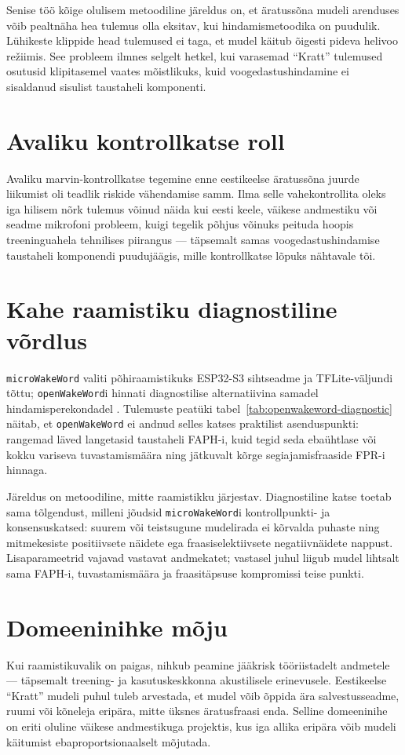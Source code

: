 Senise töö kõige olulisem metoodiline järeldus on, et äratussõna mudeli arenduses võib pealtnäha hea tulemus olla eksitav, kui hindamismetoodika on puudulik. Lühikeste klippide head tulemused ei taga, et mudel käitub õigesti pideva helivoo režiimis. See probleem ilmnes selgelt hetkel, kui varasemad \enquote{Kratt} tulemused osutusid klipitasemel vaates mõistlikuks, kuid voogedastushindamine ei sisaldanud sisulist taustaheli komponenti.

\section{Avaliku kontrollkatse roll}
Avaliku marvin-kontrollkatse tegemine enne eestikeelse äratussõna juurde liikumist oli teadlik riskide vähendamise samm. Ilma selle vahekontrollita oleks iga hilisem nõrk tulemus võinud näida kui eesti keele, väikese andmestiku või seadme mikrofoni probleem, kuigi tegelik põhjus võinuks peituda hoopis treeninguahela tehnilises piirangus --- täpsemalt samas voogedastushindamise taustaheli komponendi puudujäägis, mille kontrollkatse lõpuks nähtavale tõi.

\section{Kahe raamistiku diagnostiline võrdlus}
\texttt{microWakeWord} valiti põhiraamistikuks ESP32-S3 sihtseadme ja TFLite-väljundi tõttu; \texttt{openWakeWord}i hinnati diagnostilise alternatiivina samadel hindamisperekondadel \cite{microwakeword2026,openwakeword2026}. Tulemuste peatüki tabel~\ref{tab:openwakeword-diagnostic} näitab, et \texttt{openWakeWord} ei andnud selles katses praktilist asenduspunkti: rangemad läved langetasid taustaheli FAPH-i, kuid tegid seda ebaühtlase või kokku variseva tuvastamismäära ning jätkuvalt kõrge segiajamisfraaside FPR-i hinnaga.

Järeldus on metoodiline, mitte raamistikku järjestav. Diagnostiline katse toetab sama tõlgendust, milleni jõudsid \texttt{microWakeWord}i kontrollpunkti- ja konsensuskatsed: suurem või teistsugune mudelirada ei kõrvalda puhaste ning mitmekesiste positiivsete näidete ega fraasiselektiivsete negatiivnäidete nappust. Lisaparameetrid vajavad vastavat andmekatet; vastasel juhul liigub mudel lihtsalt sama FAPH-i, tuvastamismäära ja fraasitäpsuse kompromissi teise punkti.

\section{Domeeninihke mõju}
Kui raamistikuvalik on paigas, nihkub peamine jääkrisk tööriistadelt andmetele --- täpsemalt treening- ja kasutuskeskkonna akustilisele erinevusele. Eestikeelse \enquote{Kratt} mudeli puhul tuleb arvestada, et mudel võib õppida ära salvestusseadme, ruumi või kõneleja eripära, mitte üksnes äratusfraasi enda. Selline domeeninihe on eriti oluline väikese andmestikuga projektis, kus iga allika eripära võib mudeli käitumist ebaproportsionaalselt mõjutada.

